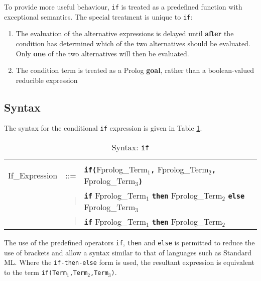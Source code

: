 \documentclass[a4paper,11pt,twoside]{article}
\begin{document}
To provide more useful behaviour, \texttt{if} is treated as a predefined
function with exceptional semantics.  The special treatment is unique
to \texttt{if}:
\begin{enumerate}
\item{The evaluation of the alternative expressions is delayed until
      \textbf{after} the condition has determined which of the
      two alternatives should be evaluated.  Only \textbf{one} of the
      two alternatives will then be evaluated.}
\item{The condition term is treated as a Prolog \textbf{goal}, rather
      than a boolean-valued reducible expression}
\end{enumerate}

\subsection{Syntax}
\enlargethispage{-\baselineskip} %

The syntax for the conditional \texttt{if} expression is given in
Table \ref{syntax:if}.

\begin{table}
{\small
\begin{tabular}{| l r l |}
\hline
 & & \\
If\_{}Expression & ::= & \texttt{\textbf{if(}}Fprolog\_{}Term$_1$\texttt{\textbf{,}}
                                              Fprolog\_{}Term$_2$\texttt{\textbf{,}}
                                              Fprolog\_{}Term$_3$\texttt{\textbf{)}}\\
 & $|$ &  \texttt{\textbf{if}} Fprolog\_{}Term$_1$ \texttt{\textbf{then}}
                               Fprolog\_{}Term$_2$ \texttt{\textbf{else}}
                               Fprolog\_{}Term$_3$\\
 & $|$ &  \texttt{\textbf{if}} Fprolog\_{}Term$_1$ \texttt{\textbf{then}}
                               Fprolog\_{}Term$_2$\\[4mm]
\hline
\end{tabular}
}
\caption{Syntax: \texttt{if}}
\label{syntax:if}
\end{table}

The use of the predefined operators \texttt{if}, \texttt{then} and \texttt{else}
is permitted to reduce the use of brackets and allow a syntax similar to that
of languages such as Standard ML.  Where the \texttt{if-then-else} form is used,
the resultant expression is equivalent to the term
\texttt{if(Term$_1$,Term$_2$,Term$_3$)}.
\end{document}
